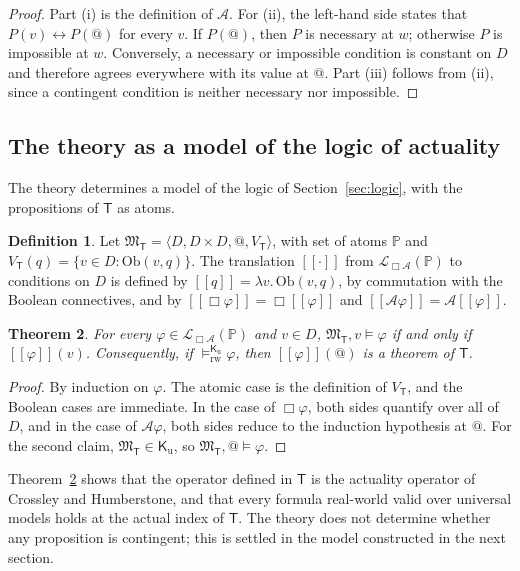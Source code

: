 \documentclass[11pt]{amsart}
\makeatletter
\theoremstyle{plain}
\newtheorem{theorem}{Theorem}[section]
\theoremstyle{definition}
\newtheorem{definition}[theorem]{Definition}
\theoremstyle{remark}
\newcommand{\Act}{\mathcal{A}}
\newcommand{\Lang}{\mathcal{L}_{\Box\Act}}
\newcommand{\Mod}{\mathfrak{M}}
\newcommand{\Kl}{\mathsf{K}}
\newcommand{\at}{@}
\newcommand{\RWv}[1]{\models^{#1}_{\mathrm{rw}}}
\newcommand{\Obt}{\mathrm{Ob}}
\newcommand{\Prop}{\mathbb{P}}
\newcommand{\Dom}{D}
\newcommand{\T}{\mathsf{T}}
\newcommand{\tr}[1]{[\![#1]\!]}
\makeatother
\begin{document}
\begin{proof}
Part (i) is the definition of $\Act$. For (ii), the left-hand side
states that $P(v) \leftrightarrow P(\at)$ for every $v$. If $P(\at)$,
then $P$ is necessary at $w$; otherwise $P$ is impossible at $w$.
Conversely, a necessary or impossible condition is constant on $\Dom$
and therefore agrees everywhere with its value at $\at$. Part (iii)
follows from (ii), since a contingent condition is neither necessary
nor impossible.
\end{proof}

\subsection{The theory as a model of the logic of actuality}

The theory determines a model of the logic of
Section~\ref{sec:logic}, with the propositions of $\T$ as atoms.

\begin{definition}
Let $\Mod_\T = \langle \Dom, \Dom \times \Dom, \at, V_\T\rangle$, with
set of atoms $\Prop$ and $V_\T(q) = \{v \in \Dom : \Obt(v,q)\}$. The
translation $\tr{\cdot}$ from $\Lang(\Prop)$ to conditions on $\Dom$ is
defined by $\tr{q} = \lambda v.\,\Obt(v,q)$, by commutation with the
Boolean connectives, and by $\tr{\Box\varphi} = \Box\tr{\varphi}$ and
$\tr{\Act\varphi} = \Act\tr{\varphi}$.
\end{definition}

\begin{theorem}
\label{thm:agreement}
For every $\varphi \in \Lang(\Prop)$ and $v \in \Dom$,
$\Mod_\T, v \models \varphi$ if and only if $\tr{\varphi}(v)$.
Consequently, if $\RWv{\Kl_{\mathrm{u}}} \varphi$, then
$\tr{\varphi}(\at)$ is a theorem of $\T$.
\end{theorem}

\begin{proof}
By induction on $\varphi$. The atomic case is the definition of
$V_\T$, and the Boolean cases are immediate. In the case of
$\Box\varphi$, both sides quantify over all of $\Dom$, and in the case
of $\Act\varphi$, both sides reduce to the induction hypothesis at
$\at$. For the second claim, $\Mod_\T \in \Kl_{\mathrm{u}}$, so
$\Mod_\T, \at \models \varphi$.
\end{proof}

Theorem~\ref{thm:agreement} shows that the operator defined in $\T$ is
the actuality operator of Crossley and Humberstone, and that every
formula real-world valid over universal models holds at the actual
index of $\T$. The theory does not determine whether any proposition is
contingent; this is settled in the model constructed in the next
section.
\end{document}
